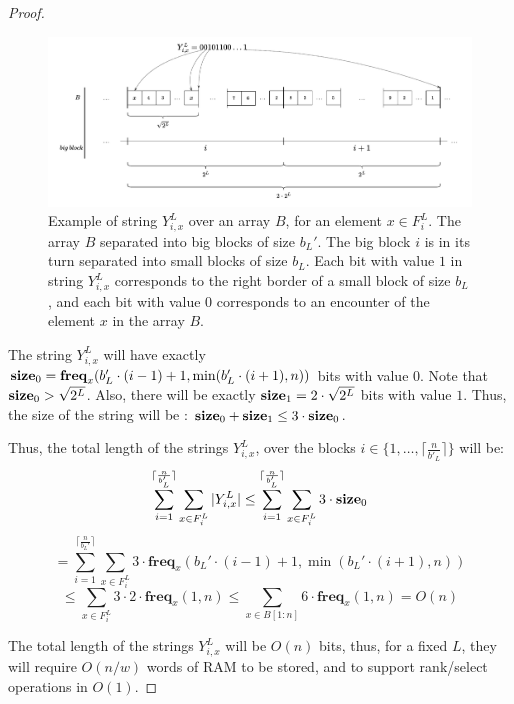 \documentclass[runningheads]{llncs}
\begin{document}
\begin{proof}
\begin{definition}
    \end{definition}


    \begin{figure}[H]
        \centering
        \hspace*{-1.2cm}      
        \includegraphics[scale=0.50]{figures/example_figure3.pdf}
        \caption{ Example of string $Y^{L}_{i,x}$ over an array $B$, for an element $x\in F_{i}^{L}$. The array $B$ separated into big blocks of size $b_L'$. The big block $i$ is in its turn separated into small blocks of size $b_L$.
            Each bit with value $1$ in string $Y^{L}_{i,x}$ corresponds to the right border of a small block of size $b_L$, and each bit with value $0$ corresponds to an encounter of the element $x$ in the array $B$.  
        }
        \label{fig:fig3}
    \end{figure}


    The string $Y_{i,x}^L$ will have exactly $\text{\textbf{size}}_0=\textbf{freq}_x(b_L'\cdot(i-1)+1, \min( b_L'\cdot (i+1), n) )$ bits with value $0$. 
    Note that $\text{\textbf{size}}_0>\sqrt{2^L}$.
    Also, there will be exactly $\text{\textbf{size}}_1=2\cdot \sqrt{2^L}$ bits with value $1$. Thus, the size of the string will be : $\text{\textbf{size}}_0+\text{\textbf{size}}_1 \leq 3 \cdot \text{\textbf{size}}_0$. 

    Thus, the total length of the strings $Y_{i,x}^L$, over the blocks $i\in \{1,\dots, \lceil \frac{n}{b'_L} \rceil\}$ will be:
    \[
        \sum_{i=1}^{\lceil \frac{n}{b_L'} \rceil } \sum_{x\in F_{i}^L } |Y_{i,x}^L| \leq \sum_{i=1}^{\lceil \frac{n}{b_L'} \rceil } \sum_{x\in F_{i}^L } 3 \cdot \text{\textbf{size}}_0
    \]
    \[
        = \sum_{i=1}^{\lceil \frac{n}{b_L'} \rceil } \sum_{x\in F_{i}^L } 3\cdot \textbf{freq}_x(b_L'\cdot(i-1)+1, \min( b_L'\cdot (i+1), n) )
    \]
    \[
        \leq \sum_{x\in F_{i}^L } 3\cdot 2 \cdot \textbf{freq}_x(1,n) \leq \sum_{x \in B[1:n]} 6 \cdot \textbf{freq}_x(1,n) = O(n)
    \]

    The total length of the strings $Y_{i,x}^L$ will be $O(n)$ bits, thus, for a fixed $L$, they will require $O(n/w)$ words of RAM to be stored, 
    and to support rank/select operations in $O(1)$.



\end{proof}
\end{document}
